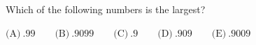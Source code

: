 Which of the following numbers is the largest?



$\text{(A)}\ .99 \qquad \text{(B)}\ .9099 \qquad \text{(C)}\ .9 \qquad \text{(D)}\ .909 \qquad \text{(E)}\ .9009$
